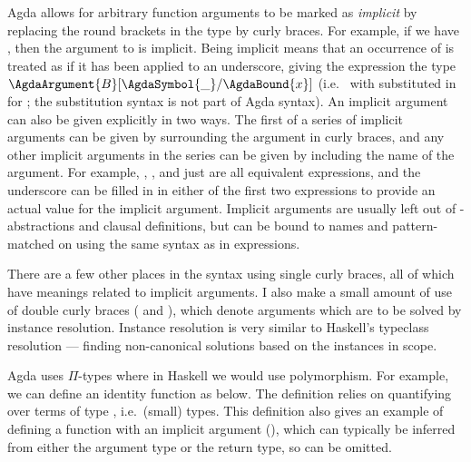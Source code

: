 Agda allows for arbitrary function arguments to be marked as \emph{implicit} by
replacing the round brackets in the type by curly braces.
For example, if we have
\AgdaSpace{}\AgdaSymbol{:}\AgdaSpace{}%
\AgdaSymbol{\{}\AgdaSpace{}\AgdaSymbol{:}\AgdaSpace{}%
\AgdaSymbol{\}}\AgdaSpace{}\AgdaSymbol{$\to$}\AgdaSpace{}%
,
then the argument to  is implicit.
Being implicit means that an occurrence of  is treated as if it has
been applied to an underscore, giving the expression  the type
$\AgdaArgument{B}[\AgdaSymbol{\_}/\AgdaBound{x}]$ (i.e.\  with
\AgdaSymbol{\_} substituted in for ; the substitution syntax is not
part of Agda syntax).
An implicit argument can also be given explicitly in two ways.
The first of a series of implicit arguments can be given by surrounding the
argument in curly braces, and any other implicit arguments in the series can be
given by including the name of the argument.
For example,
\AgdaSpace{}\AgdaSymbol{\{}\AgdaSymbol{\_}\AgdaSymbol{\}},
\AgdaSpace{}\AgdaSymbol{\{}\AgdaSpace{}%
\AgdaSymbol{=}\AgdaSpace{}\AgdaSymbol{\_}\AgdaSymbol{\}}, and just
 are all equivalent expressions, and the underscore can be filled
in in either of the first two expressions to provide an actual value for the
implicit argument.
Implicit arguments are usually left out of \AgdaSymbol{$\uplambda$}-abstractions
and clausal definitions, but can be bound to names and pattern-matched on using
the same syntax as in expressions.

There are a few other places in the syntax using single curly braces, all of
which have meanings related to implicit arguments.
I also make a small amount of use of double curly braces
(\AgdaSymbol{\{\{} and \AgdaSymbol{\}\}}), which denote arguments which are to
be solved by instance resolution.
Instance resolution is very similar to Haskell's typeclass resolution ---
finding non-canonical solutions based on the instances in scope.

Agda uses $\Pi$-types where in Haskell we would use polymorphism.
For example, we can define an identity function as below.
The definition relies on quantifying over terms of type ,
i.e.\ (small) types.
This definition also gives an example of defining a function with an implicit
argument (), which can typically be inferred from either the
argument type or the return type, so can be omitted.

